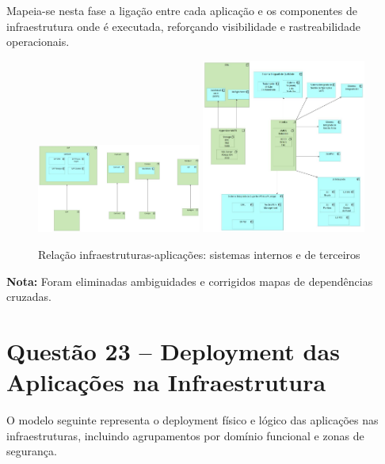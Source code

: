 \documentclass[12pt,a4paper,final]{article}
\begin{document}
    Mapeia-se nesta fase a ligação entre cada aplicação e os componentes de infraestrutura onde é executada, reforçando visibilidade e rastreabilidade operacionais.

    \begin{figure}[H]
        \centering
        \includegraphics[width=0.48\textwidth]{Q22 - Relation Between Infraestructure and Applications - 3rd Party Systems.jpg}
        \includegraphics[width=0.48\textwidth]{Q22 - Relation Between Infraestructure and Applications - CML Systems.jpg}
        \caption{Relação infraestruturas-aplicações: sistemas internos e de terceiros}
        \label{fig:q22-infra-app}
    \end{figure}

    \textbf{Nota:} Foram eliminadas ambiguidades e corrigidos mapas de dependências cruzadas.

    \section*{Questão 23 – Deployment das Aplicações na Infraestrutura}

    O modelo seguinte representa o deployment físico e lógico das aplicações nas infraestruturas, incluindo agrupamentos por domínio funcional e zonas de segurança.
\end{document}
